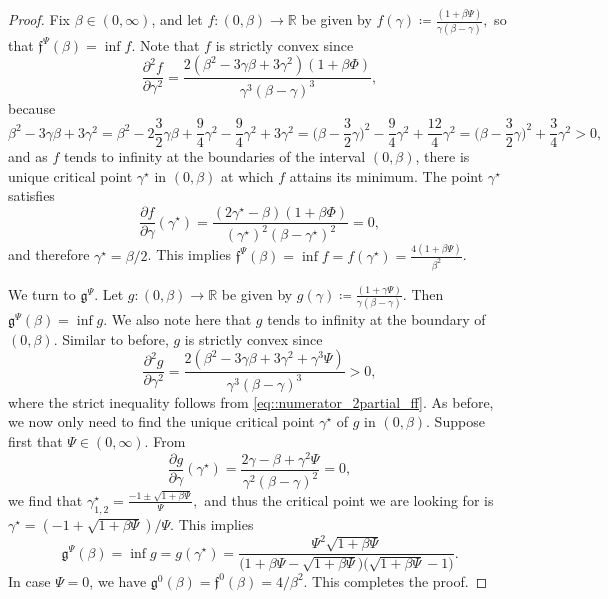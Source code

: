 \documentclass[10pt]{article} %
\newcommand\ff{\mathfrak f}
\newcommand\fg{\mathfrak g}
\def \R{\mathbb{R}}
\newcommand{\1}{\mathbf{1}}
\begin{document}
\begin{proof}
	Fix $\beta \in (0,\infty)$, and let $f : (0,\beta) \rightarrow \R$ be given by $f(\gamma) \coloneqq \frac{(1+\beta\Psi)}{\gamma(\beta-\gamma)},$ so that $\ff^\Psi(\beta) = \inf f$. Note that $f$ is strictly convex since 
	\begin{equation*}
		\frac{\partial^2 f}{\partial \gamma^2} = \frac{2(\beta^2 - 3\gamma\beta + 3 \gamma^2)(1+\beta\Phi)}{\gamma^3(\beta-\gamma)^3},
	\end{equation*}
	because
	\begin{equation}\label{eq::numerator_2partial_ff}
		\beta^2-3\gamma\beta + 3\gamma^2 = \beta^2 - 2 \frac{3}{2}\gamma \beta + \frac{9}{4}\gamma^2 - \frac{9}{4}\gamma^2 + 3\gamma^2 = \bigg(\beta - \frac{3}{2}\gamma\bigg)^2 - \frac{9}{4}\gamma^2 + \frac{12}{4}\gamma^2 = \bigg(\beta - \frac{3}{2}\gamma\bigg)^2 + \frac{3}{4}\gamma^2 > 0,
	\end{equation}
	and as $f$ tends to infinity at the boundaries of the interval $(0,\beta)$, there is unique critical point $\gamma^\star$ in $(0,\beta)$ at which $f$ attains its minimum. The point $\gamma^\star$ satisfies
	\begin{equation*}
		\frac{\partial f}{\partial \gamma} (\gamma^\star) = \frac{(2\gamma^\star- \beta)(1+\beta\Phi)}{(\gamma^\star)^2(\beta-\gamma^\star)^2} = 0,
	\end{equation*}
	and therefore $\gamma^\star = \beta/2$. This implies $\ff^\Psi(\beta) = \inf f = f(\gamma^\star) = \frac{4(1+\beta\Psi)}{\beta^2}$. 
	
	\medskip
	We turn to $\fg^\Psi$. Let $g : (0,\beta) \longrightarrow \R$ be given by $g(\gamma) \coloneqq \frac{(1+\gamma\Psi)}{\gamma(\beta-\gamma)}.$ Then $\fg^\Psi(\beta) = \inf g$. We also note here that $g$ tends to infinity at the boundary of $(0,\beta)$. Similar to before, $g$ is strictly convex since
	\begin{equation*}
		\frac{\partial^2 g}{\partial \gamma^2} = \frac{2(\beta^2-3\gamma\beta + 3\gamma^2 + \gamma^3\Psi)}{\gamma^3(\beta-\gamma)^3} > 0,
	\end{equation*}
	where the strict inequality follows from \eqref{eq::numerator_2partial_ff}. As before, we now only need to find the unique critical point $\gamma^\star$ of $g$ in $(0,\beta)$. Suppose first that $\Psi \in (0,\infty)$. From
	\begin{equation*}
		\frac{\partial g}{\partial \gamma}(\gamma^\star) = \frac{2\gamma - \beta + \gamma^2\Psi}{\gamma^2(\beta-\gamma)^2} = 0,
	\end{equation*}
	we find that $\gamma^\star_{1,2} = \frac{-1 \pm \sqrt{1+\beta\Psi}}{\Psi},$ and thus the critical point we are looking for is $\gamma^\star = (-1 +\sqrt{1+\beta\Psi})/\Psi$. This implies
	\begin{equation*}
		\fg^\Psi(\beta) = \inf g = g(\gamma^\star) = \frac{\Psi^2  \sqrt{1+\beta\Psi}}{\big(1+\beta\Psi -\sqrt{1+\beta\Psi}\big)\big(\sqrt{1+\beta\Psi}-1\big)}.
	\end{equation*}
	In case $\Psi = 0$, we have $\fg^0(\beta) = \ff^0(\beta) = 4/\beta^2$. This completes the proof.
\end{proof}
\end{document}
